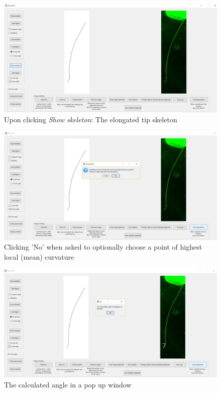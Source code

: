 \begin{figure}[H]
	\centering
	\includegraphics[width=\textwidth]{../Figures/manual/optionalB7.jpg}
	\caption{Upon clicking \textit{Show skeleton}: The elongated tip skeleton}
	\label{fig:img43}
\end{figure}

\begin{figure}[H]
	\centering
	\includegraphics[width=\textwidth]{../Figures/manual/optionalB8.jpg}
	\caption{Clicking 'No' when asked to optionally choose a point of highest local (mean) curvature}
	\label{fig:img44}
\end{figure}

\begin{figure}[H]
	\centering
	\includegraphics[width=\textwidth]{../Figures/manual/optionalB9.jpg}
	\caption{The calculated angle in a pop up window}
	\label{fig:img45}
\end{figure}


